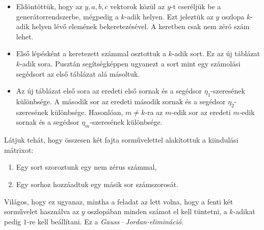 \documentclass[a4paper, showtrims]{memoir}
\theoremstyle{plain}
\theoremstyle{remark}
\theoremstyle{definition}
\begin{document}
\begin{itemize}
	\item
	      Eldöntöttük, hogy az $y,a,b,c$ vektorok közül az $y$-t cseréljük be a generátorrendszerbe,
	      mégpedig a $k$-adik helyen.
	      Ezt jeleztük az $y$ oszlopa $k$-adik helyen lévő elemének bekeretezésével.
	      A keretben csak nem zéró szám lehet.
	\item
	      Első lépésként a keretezett számmal osztottuk a $k$-adik sort. Ez az új táblázat $k$-adik sora.
	      Pusztán segítségképpen ugyanezt a sort mint egy számolási segédsort az első táblázat alá másoltuk.
	\item
	      Az új táblázat első sora az eredeti első sornak és a segédsor $\eta_1$-szeresének különbsége.
	      A második sor az eredeti második sornak és a segédsor $\eta_2$-szeresének különbsége.
	      Hasonlóan, $m\neq k$-ra az $m$-edik sor az eredeti $m$-edik sornak és a segédsor $\eta_m$-szeresének különbsége.
\end{itemize}

Látjuk tehát, hogy összesen két fajta sorművelettel alakítottuk a kiindulási mátrixot:
\begin{enumerate}
	\item Egy sort szoroztunk egy nem zérus számmal,
	\item Egy sorhoz hozzáadtuk egy másik sor számszorosát.
\end{enumerate}
Világos, hogy ez ugyanaz, mintha a feladat az lett volna,
hogy a fenti két sorművelet használva az $y$ oszlopában minden számot el kell tüntetni,
a $k$-adikat pedig $1$-re kell beállítani.
Ez a \emph{Gauss\,--\,Jordan-elimináció}.
\end{document}
